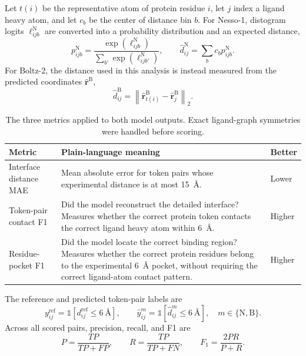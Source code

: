 \documentclass[11pt]{article}
\begin{document}
Let $t(i)$ be the representative atom of protein residue $i$, let $j$ index a
ligand heavy atom, and let $c_b$ be the center of distance bin $b$. For
Nesso-1, distogram logits $\ell^{\mathrm{N}}_{ijb}$ are converted into a
probability distribution and an expected distance,
\begin{equation}
 p^{\mathrm{N}}_{ijb}
 =\frac{\exp(\ell^{\mathrm{N}}_{ijb})}
 {\sum_{b'}\exp(\ell^{\mathrm{N}}_{ijb'})},
 \qquad
 \widehat d^{\mathrm{N}}_{ij}=\sum_b c_b p^{\mathrm{N}}_{ijb}.
 \label{eq:nesso_expected_distance}
\end{equation}
For Boltz-2, the distance used in this analysis is instead measured from the
predicted coordinates $\widehat{\mathbf r}^{\mathrm{B}}$,
\begin{equation}
 \widehat d^{\mathrm{B}}_{ij}
 =\left\|\widehat{\mathbf r}^{\mathrm{B}}_{t(i)}
 -\widehat{\mathbf r}^{\mathrm{B}}_j\right\|_2.
 \label{eq:boltz_coordinate_distance}
\end{equation}

\begin{table}[H]
\centering
\small
\begin{tabular}{L{0.26\textwidth}L{0.59\textwidth}L{0.08\textwidth}}
\toprule
Metric & Plain-language meaning & Better \\
\midrule
Interface distance MAE & Mean absolute error for token pairs whose experimental distance is at most 15~\AA{}. & Lower \\
Token-pair contact F1 & Did the model reconstruct the detailed interface? Measures whether the correct protein token contacts the correct ligand heavy atom within 6~\AA{}. & Higher \\
Residue-pocket F1 & Did the model locate the correct binding region? Measures whether the correct protein residues belong to the experimental 6~\AA{} pocket, without requiring the correct ligand-atom contact pattern. & Higher \\
\bottomrule
\end{tabular}
\caption{The three metrics applied to both model outputs. Exact ligand-graph
symmetries were handled before scoring.}
\end{table}

The reference and predicted token-pair labels are
\begin{equation}
 y^{\mathrm{ref}}_{ij}=\mathbb{1}[d^{\mathrm{ref}}_{ij}\leq 6~\text{\AA}],
 \qquad
 \widehat y^{m}_{ij}=\mathbb{1}[\widehat d^{m}_{ij}\leq 6~\text{\AA}],
 \quad m\in\{\mathrm{N},\mathrm{B}\}.
\end{equation}
Across all scored pairs, precision, recall, and F1 are
\begin{equation}
 P=\frac{TP}{TP+FP},\qquad
 R=\frac{TP}{TP+FN},\qquad
 F_1=\frac{2PR}{P+R}.
 \label{eq:f1}
\end{equation}
\end{document}
